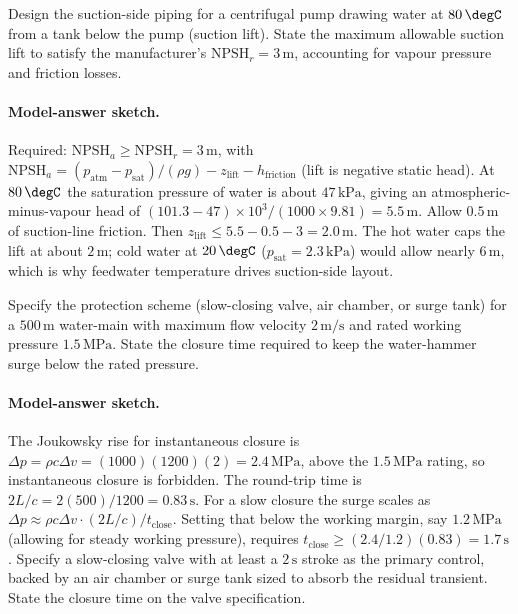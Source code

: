 \begin{exercise}
Design the suction-side piping for a centrifugal pump drawing water
at $80\,\degC$ from a tank below the pump (suction lift). State the
maximum allowable suction lift to satisfy the manufacturer's
$\text{NPSH}_r = 3\,\text{m}$, accounting for vapour pressure and
friction losses.

\paragraph{Model-answer sketch.} Required: $\text{NPSH}_a \ge
\text{NPSH}_r = 3\,\text{m}$, with
$\text{NPSH}_a = (p_{\text{atm}} - p_{\text{sat}})/(\rho g) - z_{\text{lift}}
- h_{\text{friction}}$ (lift is negative static head). At $80\,\degC$ the
saturation pressure of water is about $47\,\text{kPa}$, giving an
atmospheric-minus-vapour head of $(101.3 - 47)\times 10^3/(1000\times
9.81) = 5.5\,\text{m}$. Allow $0.5\,\text{m}$ of suction-line friction.
Then $z_{\text{lift}} \le 5.5 - 0.5 - 3 = 2.0\,\text{m}$. The hot water
caps the lift at about $2\,\text{m}$; cold water at $20\,\degC$
($p_{\text{sat}} = 2.3\,\text{kPa}$) would allow nearly $6\,\text{m}$,
which is why feedwater temperature drives suction-side layout.
\end{exercise}

\begin{exercise}
Specify the protection scheme (slow-closing valve, air chamber, or
surge tank) for a $500\,\text{m}$ water-main with maximum flow
velocity $2\,\text{m}/\text{s}$ and rated working pressure
$1.5\,\text{MPa}$. State the closure time required to keep the
water-hammer surge below the rated pressure.

\paragraph{Model-answer sketch.} The Joukowsky rise for instantaneous
closure is $\Delta p = \rho c \Delta v = (1000)(1200)(2) = 2.4\,\text{MPa}$,
above the $1.5\,\text{MPa}$ rating, so instantaneous closure is
forbidden. The round-trip time is $2L/c = 2(500)/1200 = 0.83\,\text{s}$.
For a slow closure the surge scales as $\Delta p \approx \rho c \Delta v
\cdot (2L/c)/t_{\text{close}}$. Setting that below the working margin,
say $1.2\,\text{MPa}$ (allowing for steady working pressure), requires
$t_{\text{close}} \ge (2.4/1.2)(0.83) = 1.7\,\text{s}$. Specify a
slow-closing valve with at least a $2\,\text{s}$ stroke as the primary
control, backed by an air chamber or surge tank sized to absorb the
residual transient. State the closure time on the valve specification.
\end{exercise}

